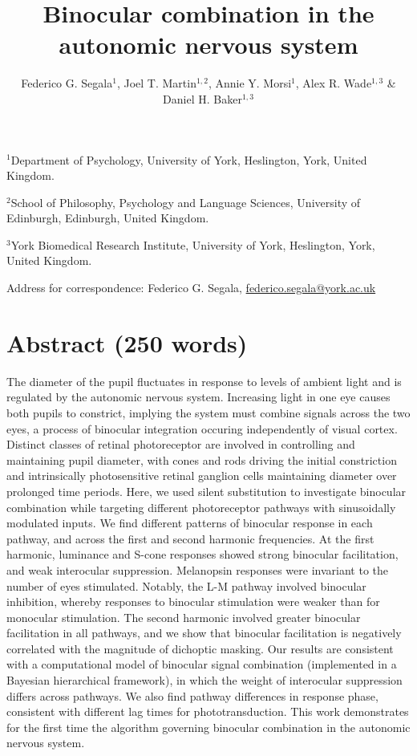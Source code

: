 \documentclass[
]{article}
\title{Binocular combination in the autonomic nervous system}
\author{Federico G. Segala\(^1\), Joel T. Martin\(^{1,2}\), Annie Y. Morsi\(^1\), Alex R. Wade\(^{1,3}\) \& Daniel H. Baker\(^{1,3}\)}
\date{}
\begin{document}
\maketitle

\(^1\)Department of Psychology, University of York, Heslington, York, United Kingdom.

\(^2\)School of Philosophy, Psychology and Language Sciences, University of Edinburgh, Edinburgh, United Kingdom.

\(^3\)York Biomedical Research Institute, University of York, Heslington, York, United Kingdom.

Address for correspondence: Federico G. Segala, \url{federico.segala@york.ac.uk}

\hypertarget{abstract-250-words}{%
\section{Abstract (250 words)}\label{abstract-250-words}}

The diameter of the pupil fluctuates in response to levels of ambient light and is regulated by the autonomic nervous system. Increasing light in one eye causes both pupils to constrict, implying the system must combine signals across the two eyes, a process of binocular integration occuring independently of visual cortex. Distinct classes of retinal photoreceptor are involved in controlling and maintaining pupil diameter, with cones and rods driving the initial constriction and intrinsically photosensitive retinal ganglion cells maintaining diameter over prolonged time periods. Here, we used silent substitution to investigate binocular combination while targeting different photoreceptor pathways with sinusoidally modulated inputs. We find different patterns of binocular response in each pathway, and across the first and second harmonic frequencies. At the first harmonic, luminance and S-cone responses showed strong binocular facilitation, and weak interocular suppression. Melanopsin responses were invariant to the number of eyes stimulated. Notably, the L-M pathway involved binocular inhibition, whereby responses to binocular stimulation were weaker than for monocular stimulation. The second harmonic involved greater binocular facilitation in all pathways, and we show that binocular facilitation is negatively correlated with the magnitude of dichoptic masking. Our results are consistent with a computational model of binocular signal combination (implemented in a Bayesian hierarchical framework), in which the weight of interocular suppression differs across pathways. We also find pathway differences in response phase, consistent with different lag times for phototransduction. This work demonstrates for the first time the algorithm governing binocular combination in the autonomic nervous system.
\end{document}
